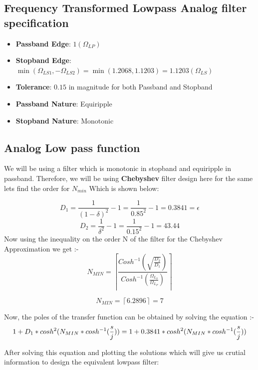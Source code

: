 \documentclass{scrartcl}
\begin{document}
\subsection{Frequency Transformed Lowpass Analog filter specification}

\begin{itemize}
    \item \textbf{Passband Edge}: $1 (\Omega_{LP})$
    \item \textbf{Stopband Edge}: $\min(\Omega_{LS1},-\Omega_{LS2}) = \min(1.2068, 1.1203) = 1.1203 (\Omega_{LS})$
    \item \textbf{Tolerance}: $0.15$ in magnitude for both Passband and Stopband
    \item \textbf{Passband Nature}: Equiripple
    \item \textbf{Stopband Nature}: Monotonic
\end{itemize}

\subsection{Analog Low pass function}
We will be using a filter which is monotonic in stopband and equiripple in passband. Therefore, we will be using \textbf{Chebyshev} filter design here for the same lets find the order for $N_{min}$ Which is shown below:

$$D_1 = \frac{1}{(1 - \delta)^2} - 1 = \frac{1}{0.85^2} - 1 = 0.3841 = \epsilon$$
$$D_2 = \frac{1}{\delta^2} - 1 = \frac{1}{0.15^2} - 1 = 43.44$$
Now using the inequality on the order N of the filter for the Chebyshev Approximation we get :-
$$N_{MIN} = \left\lceil\frac{Cosh^{-1}(\sqrt{\frac{D_2}{D_1}})}{Cosh^{-1}(\frac{\Omega_{L_S}}{\Omega_{L_P}})}\right\rceil$$

$$N_{MIN} = \left\lceil 6.2896 \right\rceil = 7$$

Now, the poles of the transfer function can be obtained by solving the equation :-
\begin{equation}
    \centering
1 + D_1*cosh^2(N_{MIN}*cosh^{-1}(\frac{s}{j})) = 1 + 0.3841*cosh^2(N_{MIN}*cosh^{-1}(\frac{s}{j}))
\end{equation}

After solving this equation and plotting the solutions which will give us crutial information to design the equivalent lowpass filter:
\end{document}
